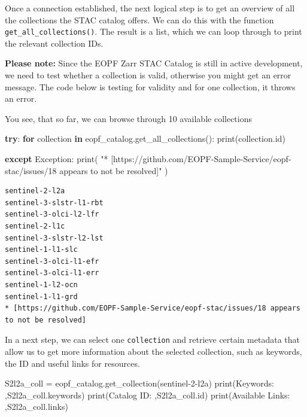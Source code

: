 \documentclass[
  letterpaper,
  DIV=11,
  numbers=noendperiod]{scrreprt}
\newenvironment{Shaded}{\begin{snugshade}}{\end{snugshade}}
\newcommand{\BuiltInTok}[1]{\textcolor[rgb]{0.00,0.23,0.31}{#1}}
\newcommand{\ControlFlowTok}[1]{\textcolor[rgb]{0.00,0.23,0.31}{\textbf{#1}}}
\newcommand{\KeywordTok}[1]{\textcolor[rgb]{0.00,0.23,0.31}{\textbf{#1}}}
\newcommand{\NormalTok}[1]{\textcolor[rgb]{0.00,0.23,0.31}{#1}}
\newcommand{\OperatorTok}[1]{\textcolor[rgb]{0.37,0.37,0.37}{#1}}
\newcommand{\PreprocessorTok}[1]{\textcolor[rgb]{0.68,0.00,0.00}{#1}}
\newcommand{\StringTok}[1]{\textcolor[rgb]{0.13,0.47,0.30}{#1}}
\begin{document}
Once a connection established, the next logical step is to get an
overview of all the collections the STAC catalog offers. We can do this
with the function \texttt{get\_all\_collections()}. The result is a
list, which we can loop through to print the relevant collection IDs.

\textbf{Please note:} Since the EOPF Zarr STAC Catalog is still in
active development, we need to test whether a collection is valid,
otherwise you might get an error message. The code below is testing for
validity and for one collection, it throws an error.

You see, that so far, we can browse through 10 available collections

\begin{Shaded}
\begin{Highlighting}[]
\ControlFlowTok{try}\NormalTok{:}
    \ControlFlowTok{for}\NormalTok{ collection }\KeywordTok{in}\NormalTok{ eopf\_catalog.get\_all\_collections():}
        \BuiltInTok{print}\NormalTok{(collection.}\BuiltInTok{id}\NormalTok{)}

\ControlFlowTok{except} \PreprocessorTok{Exception}\NormalTok{:}
    \BuiltInTok{print}\NormalTok{(}
        \StringTok{"* [https://github.com/EOPF{-}Sample{-}Service/eopf{-}stac/issues/18 appears to not be resolved]"}
\NormalTok{    )}
\end{Highlighting}
\end{Shaded}

\begin{verbatim}
sentinel-2-l2a
sentinel-3-slstr-l1-rbt
sentinel-3-olci-l2-lfr
sentinel-2-l1c
sentinel-3-slstr-l2-lst
sentinel-1-l1-slc
sentinel-3-olci-l1-efr
sentinel-3-olci-l1-err
sentinel-1-l2-ocn
sentinel-1-l1-grd
* [https://github.com/EOPF-Sample-Service/eopf-stac/issues/18 appears to not be resolved]
\end{verbatim}

In a next step, we can select one \texttt{collection} and retrieve
certain metadata that allow us to get more information about the
selected collection, such as keywords, the ID and useful links for
resources.

\begin{Shaded}
\begin{Highlighting}[]
\NormalTok{S2l2a\_coll }\OperatorTok{=}\NormalTok{ eopf\_catalog.get\_collection(}\StringTok{\textquotesingle{}sentinel{-}2{-}l2a\textquotesingle{}}\NormalTok{)}
\BuiltInTok{print}\NormalTok{(}\StringTok{\textquotesingle{}Keywords:        \textquotesingle{}}\NormalTok{,S2l2a\_coll.keywords)}
\BuiltInTok{print}\NormalTok{(}\StringTok{\textquotesingle{}Catalog ID:      \textquotesingle{}}\NormalTok{,S2l2a\_coll.}\BuiltInTok{id}\NormalTok{)}
\BuiltInTok{print}\NormalTok{(}\StringTok{\textquotesingle{}Available Links: \textquotesingle{}}\NormalTok{,S2l2a\_coll.links)}
\end{Highlighting}
\end{Shaded}
\end{document}
